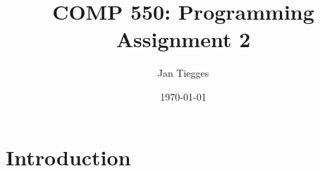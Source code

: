 \documentclass[12pt]{article}
\title{\textbf{COMP 550: Programming Assignment 2}}
\date{\today}
\author{Jan Tiegges}
\begin{document}
\maketitle

\section{Introduction}
\end{document}
